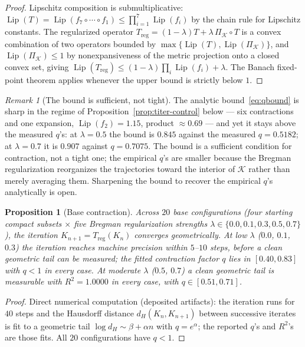 \documentclass[11pt,a4paper]{article}
\theoremstyle{plain}
\newtheorem{proposition}[theorem]{Proposition}
\theoremstyle{definition}
\theoremstyle{remark}
\newtheorem{remark}[theorem]{Remark}
\DeclareMathOperator{\Lip}{Lip}
\begin{document}
\begin{proof}
Lipschitz composition is submultiplicative:
$\Lip(T)=\Lip(f_7\circ\cdots\circ f_1)\leq\prod_{i=1}^{7}\Lip(f_i)
$ by the chain rule for Lipschitz constants. The regularized
operator $T_{\mathrm{reg}}=(1-\lambda)T+\lambda\,
\Pi_{\mathcal K}\!\circ T$ is a convex combination of two
operators bounded by $\max\{\Lip(T),\Lip(\Pi_{\mathcal K})\}$,
and $\Lip(\Pi_{\mathcal K})\leq1$ by nonexpansiveness of the
metric projection onto a closed convex set, giving
$\Lip(T_{\mathrm{reg}})\leq(1-\lambda)\prod_i\Lip(f_i)+\lambda$.
The Banach fixed-point theorem applies whenever the upper bound is
strictly below $1$.
\end{proof}

\begin{remark}[The bound is sufficient, not tight]
\label{rem:qbound-tightness}
The analytic bound~\eqref{eq:qbound} is sharp in the regime of
Proposition~\ref{prop:titer-control} below --- six contractions
and one expansion, $\Lip(f_2)=1.15$, product $\approx0.69$ --- and
yet it stays above the measured $q$'s: at $\lambda=0.5$ the bound
is $0.845$ against the measured $q=0.5182$; at $\lambda=0.7$ it is
$0.907$ against $q=0.7075$. The bound is a sufficient condition
for contraction, not a tight one; the empirical $q$'s are smaller
because the Bregman regularization reorganizes the trajectories
toward the interior of $\mathcal K$ rather than merely averaging
them. Sharpening the bound to recover the empirical $q$'s
analytically is open.
\end{remark}

\begin{proposition}[Base contraction]\label{prop:titer-base}
Across $20$ base configurations (four starting compact subsets
$\times$ five Bregman regularization strengths
$\lambda\in\{0.0,0.1,0.3,0.5,0.7\}$), the iteration
$K_{n+1}=T_{\mathrm{reg}}(K_n)$ converges geometrically. At low
$\lambda$ ($0.0$, $0.1$, $0.3$) the iteration reaches machine
precision within $5$--$10$ steps, before a clean geometric tail
can be measured; the fitted contraction factor $q$ lies in
$[0.40,0.83]$ with $q<1$ in every case. At moderate $\lambda$
($0.5$, $0.7$) a clean geometric tail is measurable with
$R^{2}=1.0000$ in every case, with $q\in[0.51,0.71]$.
\end{proposition}

\begin{proof}
Direct numerical computation (deposited artifacts): the iteration
runs for $40$ steps and the Hausdorff distance
$d_H(K_n,K_{n+1})$ between successive iterates is fit to a
geometric tail $\log d_H\sim\beta+\alpha n$ with $q=e^{\alpha}$;
the reported $q$'s and $R^{2}$'s are those fits. All $20$
configurations have $q<1$.
\end{proof}
\end{document}
